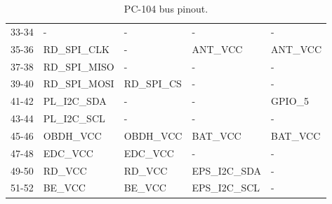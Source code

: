 \begin{table}[!h]
\begin{tabular}{cllll}
        33-34              & -                & -                & -               & -                \\
        35-36              & RD\_SPI\_CLK     & -                & ANT\_VCC        & ANT\_VCC         \\
        37-38              & RD\_SPI\_MISO    & -                & -               & -                \\
        39-40              & RD\_SPI\_MOSI    & RD\_SPI\_CS      & -               & -                \\
        41-42              & PL\_I2C\_SDA     & -                & -               & GPIO\_5          \\
        43-44              & PL\_I2C\_SCL     & -                & -               & -                \\
        45-46              & OBDH\_VCC        & OBDH\_VCC        & BAT\_VCC        & BAT\_VCC         \\
        47-48              & EDC\_VCC         & EDC\_VCC         & -               & -                \\
        49-50              & RD\_VCC          & RD\_VCC          & EPS\_I2C\_SDA   & -                \\
        51-52              & BE\_VCC          & BE\_VCC          & EPS\_I2C\_SCL   & -                \\
        \bottomrule[1.5pt]
    \end{tabular}
    \caption{PC-104 bus pinout.}
    \label{tab:pc104-pinout}
\end{table}

